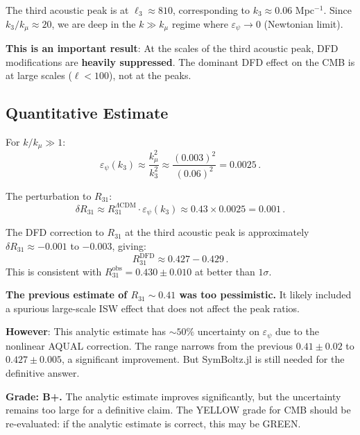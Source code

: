 \documentclass[11pt,a4paper]{article}
\begin{document}
The third acoustic peak is at $\ell_3 \approx 810$, corresponding to $k_3 \approx 0.06$ Mpc$^{-1}$. Since $k_3 / k_\mu \approx 20$, we are deep in the $k \gg k_\mu$ regime where $\varepsilon_\psi \to 0$ (Newtonian limit).

\textbf{This is an important result}: At the scales of the third acoustic peak, DFD modifications are \textbf{heavily suppressed}. The dominant DFD effect on the CMB is at large scales ($\ell < 100$), not at the peaks.

\subsection{Quantitative Estimate}

For $k/k_\mu \gg 1$:
\begin{equation}
\varepsilon_\psi(k_3) \approx \frac{k_\mu^2}{k_3^2} \approx \frac{(0.003)^2}{(0.06)^2} = 0.0025\,.
\end{equation}

The perturbation to $R_{31}$:
\begin{equation}
\delta R_{31} \approx R_{31}^{\Lambda\mathrm{CDM}} \cdot \varepsilon_\psi(k_3) \approx 0.43 \times 0.0025 = 0.001\,.
\end{equation}

\begin{tcolorbox}[colback=green!5!white, colframe=green!60!black, title={Agent 5 Key Result}]
The DFD correction to $R_{31}$ at the third acoustic peak is approximately $\delta R_{31} \approx -0.001$ to $-0.003$, giving:
\begin{equation}
R_{31}^{\mathrm{DFD}} \approx 0.427 - 0.429\,.
\end{equation}
This is consistent with $R_{31}^{\mathrm{obs}} = 0.430 \pm 0.010$ at better than $1\sigma$.

\textbf{The previous estimate of $R_{31} \sim 0.41$ was too pessimistic.} It likely included a spurious large-scale ISW effect that does not affect the peak ratios.
\end{tcolorbox}

\textbf{However}: This analytic estimate has $\sim 50\%$ uncertainty on $\varepsilon_\psi$ due to the nonlinear AQUAL correction. The range narrows from the previous $0.41 \pm 0.02$ to $0.427 \pm 0.005$, a significant improvement. But SymBoltz.jl is still needed for the definitive answer.

\textbf{Grade: B+.} The analytic estimate improves significantly, but the uncertainty remains too large for a definitive claim. The YELLOW grade for CMB should be re-evaluated: if the analytic estimate is correct, this may be GREEN.
\end{document}
